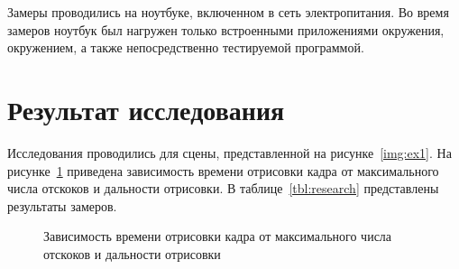 Замеры проводились на ноутбуке, включенном в сеть 
электропитания. Во время замеров ноутбук был нагружен только 
встроенными приложениями окружения, окружением, а 
также непосредственно тестируемой программой.

\section{Результат исследования}

Исследования проводились для сцены, представленной на рисунке~\ref{img:ex1}.
На рисунке~\ref{img:research} приведена зависимость времени отрисовки кадра от максимального числа отскоков и дальности отрисовки. В таблице~\ref{tbl:research} представлены результаты
замеров.

\begin{figure}[H]
  \centering
  
  \caption{\label{img:research}Зависимость времени отрисовки кадра от максимального числа отскоков и дальности отрисовки}
\end{figure}

